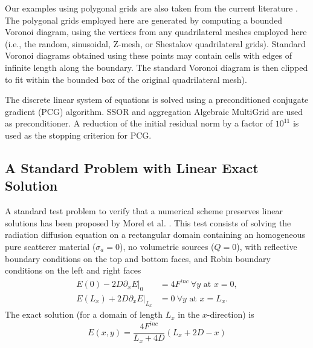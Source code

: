 \documentclass[preprint,10pt]{elsarticle}
\begin{document}
Our examples using polygonal grids are also taken from the current literature 
\cite{Kuznetsov2004,Brezzi2005,BaileyAdams2008}.
The polygonal grids employed here are generated by computing a bounded Voronoi diagram, using the 
vertices from any quadrilateral meshes employed here (i.e., the random, sinusoidal, Z-mesh, 
or Shestakov quadrilateral grids). Standard Voronoi diagrams obtained using these points 
may contain cells with edges of infinite length along the boundary. The standard Voronoi diagram 
is then clipped to fit within the bounded box of the original quadrilateral mesh).

The discrete linear system of equations is solved using a preconditioned conjugate gradient (PCG) algorithm. 
SSOR and aggregation Algebraic MultiGrid \cite{agmg}  are used as preconditioner. A reduction of the
initial residual norm by a factor of $10^{11}$ is used as the stopping criterion for PCG. 

\subsection{A Standard Problem with Linear Exact Solution} \label{sec:results_linear}
A standard test problem to verify that a numerical scheme preserves linear solutions has been
proposed by Morel et al. \cite{Morel1992}. This test consists
of solving the radiation diffusion equation on a rectangular domain containing an homogeneous pure 
scatterer material ($\sigma_a=0$), no volumetric sources ($Q=0$), with reflective boundary conditions 
on the top and bottom faces, and Robin boundary conditions on the left and right faces
\begin{align}
  E(0) - 2 D \left.\partial_x E\right|_0 &= 4F^{inc} \ \forall y \textrm{ at } x=0, \\
  E(L_x) + 2 D \left.\partial_x E\right|_{L_x} &= 0 \ \forall y \textrm{ at } x=L_x.
\end{align}
The exact solution (for a domain of length $L_x$ in the $x$-direction) is
\begin{equation}
E(x,y) = 	\frac{4F^{inc}}{L_x+4D}\left(L_x+2D-x \right)
\end{equation}
\end{document}
